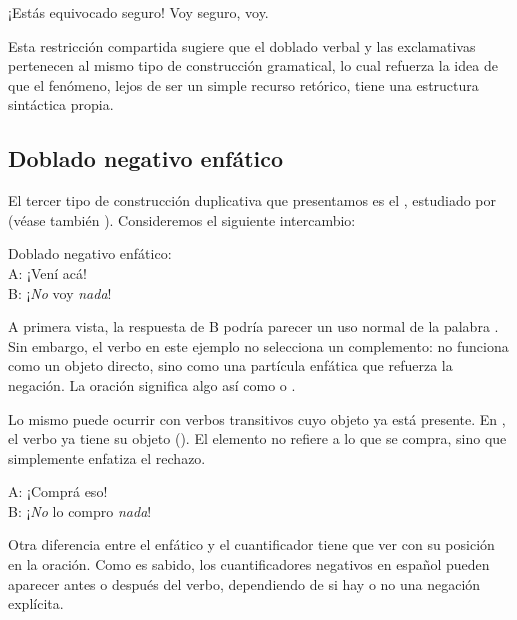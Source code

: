 \begin{exe}
  \ex\label{ex:15-certeza}
    \begin{xlist}
      \ex ¡Estás equivocado seguro!
      \ex Voy seguro, voy.
    \end{xlist}
\end{exe}

Esta restricción compartida sugiere que el doblado verbal y las exclamativas
pertenecen al mismo tipo de construcción gramatical, lo cual refuerza la idea de
que el fenómeno, lejos de ser un simple recurso retórico, tiene una estructura
sintáctica propia.

\subsection{Doblado negativo enfático}\label{sec:15-negativo}

El tercer tipo de construcción duplicativa que presentamos es el
, estudiado por \textcite{ditullio2008} (véase
también \cite{johnson2019}). Consideremos el siguiente intercambio:

\begin{exe}
  \ex\label{ex:15-nada1} Doblado negativo enfático:\\
      A: ¡Vení acá!\\
      B: ¡\textit{No} voy \textit{nada}!
\end{exe}

A primera vista, la respuesta de B podría parecer un uso normal de la palabra
. Sin embargo, el verbo  en este ejemplo no selecciona un
complemento:  no funciona como un objeto directo, sino como una
partícula enfática que refuerza la negación. La oración 
significa algo así como  o .

Lo mismo puede ocurrir con verbos transitivos cuyo objeto ya está presente. En
, el verbo  ya tiene su objeto (). El
elemento  no refiere a lo que se compra, sino que simplemente
enfatiza el rechazo.

\begin{exe}
  \ex\label{ex:15-nada2} A: ¡Comprá eso!\\
      B: ¡\textit{No} lo compro \textit{nada}!
\end{exe}

Otra diferencia entre el  enfático y el cuantificador 
tiene que ver con su posición en la oración. Como es sabido, los cuantificadores
negativos en español pueden aparecer antes o después del verbo, dependiendo de si
hay o no una negación explícita.

